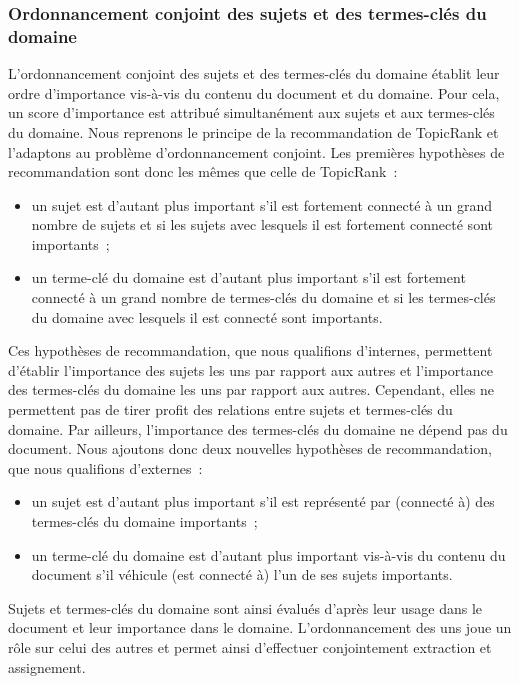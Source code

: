     \subsubsection{Ordonnancement conjoint des sujets et des termes-clés du domaine}
    \label{subsubsec:main-domain_specific_keyphrase_annotation-supervised_automatic_keyphrase_extraction-topiccorank-co_ranking}
      L'ordonnancement conjoint des sujets et des termes-clés du domaine
      établit leur ordre d'importance vis-à-vis du contenu du document et du
      domaine. Pour cela, un score d'importance est attribué simultanément aux
      sujets et aux termes-clés du domaine.
%
      Nous reprenons le principe de la recommandation de TopicRank et
      l'adaptons au problème d'ordonnancement conjoint. Les premières
      hypothèses de recommandation sont donc les mêmes que celle de
      TopicRank~:
      \begin{itemize}
        \item{un sujet est d'autant plus important s'il est fortement connecté
              à un grand nombre de sujets et si les sujets avec lesquels il
              est fortement connecté sont importants~;}
        \item{un terme-clé du domaine est d'autant plus important s'il est
              fortement connecté à un grand nombre de termes-clés du domaine
              et si les termes-clés du domaine avec lesquels il est connecté
              sont importants.}
      \end{itemize}
      Ces hypothèses de recommandation, que nous qualifions d'internes,
      permettent d'établir l'importance des sujets les uns par rapport aux
      autres et l'importance des termes-clés du domaine les uns par rapport
      aux autres. Cependant, elles ne permettent pas de tirer profit des
      relations entre sujets et termes-clés du domaine. Par ailleurs,
      l'importance des termes-clés du domaine ne  dépend pas du document. Nous
      ajoutons donc deux nouvelles hypothèses de recommandation, que nous
      qualifions d'externes~:
      \begin{itemize}
        \item{un sujet est d'autant plus important s'il est représenté par
              (connecté à) des termes-clés du domaine importants~;}
        \item{un terme-clé du domaine est d'autant plus important vis-à-vis
              du contenu du document s'il véhicule (est connecté à) l'un de
              ses sujets importants.}
      \end{itemize}
      Sujets et termes-clés du domaine sont ainsi évalués d'après leur usage
      dans le document et leur importance dans le domaine. L'ordonnancement
      des uns joue un rôle sur celui des autres et permet ainsi d'effectuer
      conjointement extraction et assignement.

